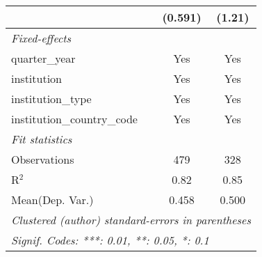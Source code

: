 \begin{tabular}{lcc}
                                          & (0.591) & (1.21)\\   
   \midrule
   \emph{Fixed-effects}\\
   quarter\_year                          & Yes     & Yes\\  
   institution                            & Yes     & Yes\\  
   institution\_type                      & Yes     & Yes\\  
   institution\_country\_code             & Yes     & Yes\\  
   \midrule
   \emph{Fit statistics}\\
   Observations                           & 479     & 328\\  
   R$^2$                                  & 0.82    & 0.85\\  
Mean(Dep. Var.) & 0.458 & 0.500 \\
   \midrule \midrule
   \multicolumn{3}{l}{\emph{Clustered (author) standard-errors in parentheses}}\\
   \multicolumn{3}{l}{\emph{Signif. Codes: ***: 0.01, **: 0.05, *: 0.1}}\\
\end{tabular}
\par\endgroup
